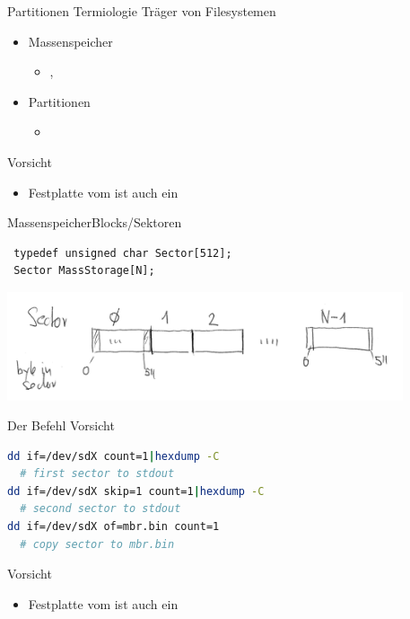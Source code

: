 \begin{frame}{Partitionen Termiologie \linux}{Träger von Filesystemen}
  \begin{itemize}
   \item Massenspeicher
   \begin{itemize}
   \item {}, 
   \end{itemize} 
   \item Partitionen 
   \begin{itemize}
     \item {}  
   \end{itemize} 
  \end{itemize}
  \begin{block}{\Huge Vorsicht}
   \begin{itemize}
    \item Festplatte vom \host ist auch ein 
   \end{itemize}
  \end{block}
\end{frame} 


\begin{frame}[fragile]{Massenspeicher}{Blocks/Sektoren}
\begin{lstlisting}
 typedef unsigned char Sector[512]; 
 Sector MassStorage[N];
\end{lstlisting}
\begin{center}
\includegraphics[width=0.875\textwidth]{array-of-sector.jpg}
\end{center}
\end{frame}

\begin{frame}[fragile]{Der Befehl }{Vorsicht}
\begin{lstlisting}[language=bash]
dd if=/dev/sdX count=1|hexdump -C        
  # first sector to stdout
dd if=/dev/sdX skip=1 count=1|hexdump -C 
  # second sector to stdout
dd if=/dev/sdX of=mbr.bin count=1        
  # copy sector to mbr.bin
\end{lstlisting}
  \begin{block}{\Huge Vorsicht}
   \begin{itemize}
    \item Festplatte vom \host ist auch ein 
   \end{itemize}
  \end{block}

\end{frame}

